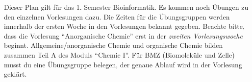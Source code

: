 Dieser Plan gilt für das 1. Semester Bioinformatik. Es kommen noch Übungen
zu den einzelnen Vorlesungen dazu. Die Zeiten für die Übungsgruppen werden innerhalb der ersten Woche in den Vorlesungen bekannt gegeben.
Beachte bitte, dass die Vorlesung "`Anorganische Chemie"' erst in der \textit{zweiten Vorlesungswoche} beginnt.
Allgemeine/anorganische Chemie und organische Chemie bilden zusammen Teil A des Moduls "`Chemie I"'.
Für BMZ (Biomoleküle und Zelle) musst du eine Übungsgruppe belegen, der genaue Ablauf wird in der Vorlesung geklärt.


